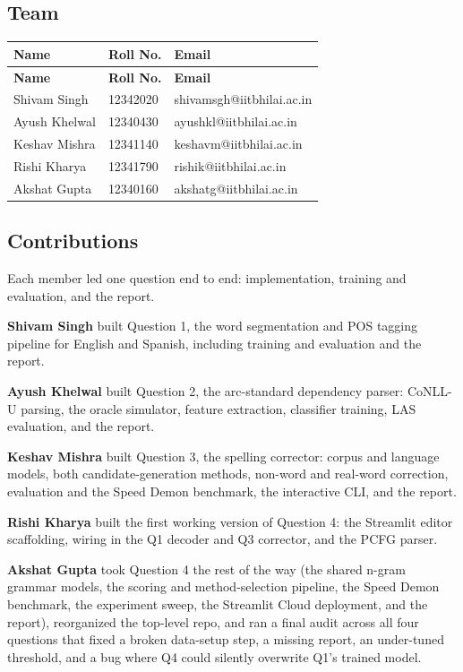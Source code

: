 \documentclass[11pt,a4paper]{article}
\begin{document}
\subsection*{Team}

{\small
\setlength{\tabcolsep}{4pt}
\begin{longtable}{lll}
\toprule
\textbf{Name} & \textbf{Roll No.} & \textbf{Email} \\
\midrule
\endfirsthead
\toprule
\textbf{Name} & \textbf{Roll No.} & \textbf{Email} \\
\midrule
\endhead
Shivam Singh & 12342020 & shivamsgh@iitbhilai.ac.in \\
Ayush Khelwal & 12340430 & ayushkl@iitbhilai.ac.in \\
Keshav Mishra & 12341140 & keshavm@iitbhilai.ac.in \\
Rishi Kharya & 12341790 & rishik@iitbhilai.ac.in \\
Akshat Gupta & 12340160 & akshatg@iitbhilai.ac.in \\
\bottomrule
\end{longtable}}

\subsection*{Contributions}

Each member led one question end to end: implementation, training and evaluation, and the report.

\textbf{Shivam Singh} built Question 1, the word segmentation and POS tagging pipeline for English and Spanish, including training and evaluation and the report.

\textbf{Ayush Khelwal} built Question 2, the arc-standard dependency parser: CoNLL-U parsing, the oracle simulator, feature extraction, classifier training, LAS evaluation, and the report.

\textbf{Keshav Mishra} built Question 3, the spelling corrector: corpus and language models, both candidate-generation methods, non-word and real-word correction, evaluation and the Speed Demon benchmark, the interactive CLI, and the report.

\textbf{Rishi Kharya} built the first working version of Question 4: the Streamlit editor scaffolding, wiring in the Q1 decoder and Q3 corrector, and the PCFG parser.

\textbf{Akshat Gupta} took Question 4 the rest of the way (the shared n-gram grammar models, the scoring and method-selection pipeline, the Speed Demon benchmark, the experiment sweep, the Streamlit Cloud deployment, and the report), reorganized the top-level repo, and ran a final audit across all four questions that fixed a broken data-setup step, a missing report, an under-tuned threshold, and a bug where Q4 could silently overwrite Q1's trained model.
\end{document}
